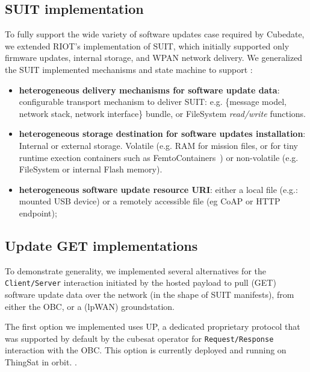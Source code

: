 \subsection{SUIT implementation}

To fully support the wide variety of software updates case required by Cubedate, we extended RIOT's implementation of SUIT, which initially supported only firmware updates, internal storage, and WPAN network delivery. We generalized the SUIT implemented mechanisms and state machine to support :

\begin{itemize}
    \item \textbf{heterogeneous delivery mechanisms for software update data}: configurable transport mechanism to deliver SUIT:
    e.g. \{message model, network stack, network interface\}
    bundle, or FileSystem \textit{read/write} functions.
    \item \textbf{heterogeneous storage destination for software updates installation}: Internal or external storage. Volatile 
     (e.g. RAM for mission files, or for tiny runtime exection containers such as FemtoContainers~\cite{zandberg2021femto})
    or non-volatile (e.g. FileSystem or internal Flash memory).
     \item \textbf{heterogeneous software update resource URI}: either a local file (e.g.: mounted USB device) or a remotely accessible file (eg CoAP or HTTP endpoint);
\end{itemize}

\subsection{Update GET implementations}

To demonstrate generality, we implemented several alternatives for the \texttt{Client/Server} interaction initiated by the hosted payload to pull (GET) software update data over the network (in the shape of SUIT manifests), from either the OBC, or a (lpWAN) groundstation.

The first option we implemented uses UP, a dedicated proprietary protocol that was supported by default by the cubesat operator for \texttt{Request/Response} interaction with the OBC. This option is currently deployed and running on ThingSat in orbit. .

